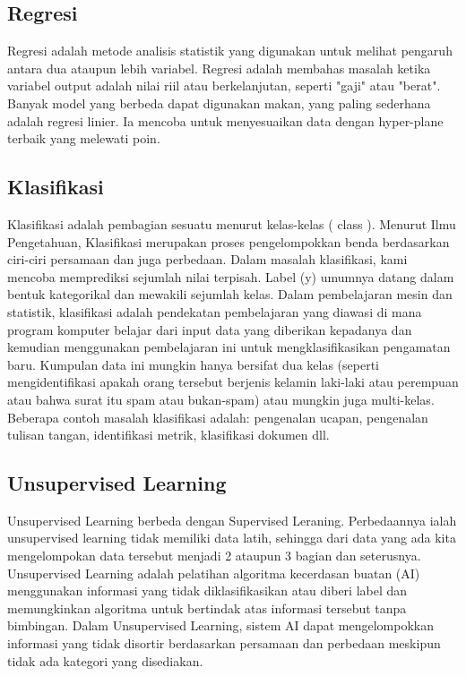 \subsection{Regresi}
Regresi adalah metode analisis statistik yang digunakan untuk melihat pengaruh antara dua ataupun lebih variabel. Regresi adalah membahas masalah ketika variabel output adalah nilai riil atau berkelanjutan, seperti "gaji" atau "berat". Banyak model yang berbeda dapat digunakan makan, yang paling sederhana adalah regresi linier. Ia mencoba untuk menyesuaikan data dengan hyper-plane terbaik yang melewati poin.

\subsection{Klasifikasi}
Klasifikasi adalah pembagian sesuatu menurut kelas-kelas ( class ). Menurut Ilmu Pengetahuan, Klasifikasi merupakan proses pengelompokkan benda berdasarkan ciri-ciri persamaan dan juga perbedaan. Dalam masalah klasifikasi, kami mencoba memprediksi sejumlah nilai terpisah. Label (y) umumnya datang dalam bentuk kategorikal dan mewakili sejumlah kelas. Dalam pembelajaran mesin dan statistik, klasifikasi adalah pendekatan pembelajaran yang diawasi di mana program komputer belajar dari input data yang diberikan kepadanya dan kemudian menggunakan pembelajaran ini untuk mengklasifikasikan pengamatan baru. Kumpulan data ini mungkin hanya bersifat dua kelas (seperti mengidentifikasi apakah orang tersebut berjenis kelamin laki-laki atau perempuan atau bahwa surat itu spam atau bukan-spam) atau mungkin juga multi-kelas. Beberapa contoh masalah klasifikasi adalah: pengenalan ucapan, pengenalan tulisan tangan, identifikasi metrik, klasifikasi dokumen dll.

\subsection{Unsupervised Learning}
Unsupervised Learning berbeda dengan Supervised Leraning. Perbedaannya ialah unsupervised learning tidak memiliki data latih, sehingga dari data yang ada kita mengelompokan data tersebut menjadi 2 ataupun 3 bagian dan seterusnya. Unsupervised Learning adalah pelatihan algoritma kecerdasan buatan (AI) menggunakan informasi yang tidak diklasifikasikan atau diberi label dan memungkinkan algoritma untuk bertindak atas informasi tersebut tanpa bimbingan. Dalam Unsupervised Learning, sistem AI dapat mengelompokkan informasi yang tidak disortir berdasarkan persamaan dan perbedaan meskipun tidak ada kategori yang disediakan.

